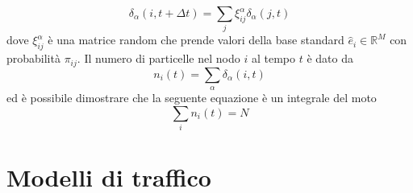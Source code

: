 \documentclass[../main.tex]{subfiles}
\begin{document}
\begin{equation}
    \delta_\alpha(i,t+\Delta t)=\sum_j\xi_{ij}^\alpha\delta_\alpha(j,t)
\end{equation}
dove $\xi_{ij}^\alpha$ è una matrice random che prende valori della base standard $\widehat{e}_i\in \mathbb{R}^M$ con probabilità $\pi_{ij}$.
Il numero di particelle nel nodo $i$ al tempo $t$ è dato da
\begin{equation}
    n_i(t)=\sum_\alpha\delta_\alpha(i,t)
\end{equation}
ed è possibile dimostrare \cite{RandomWalks} che la seguente equazione è un integrale del moto
\begin{equation}
    \sum_in_i(t)=N
\end{equation}

\section{Modelli di traffico}
\end{document}

